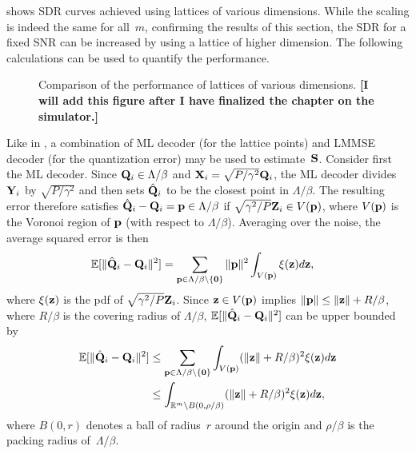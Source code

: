  shows SDR curves achieved using lattices of various
dimensions. While the scaling is indeed the same for all~$m$, confirming the
results of this section, the SDR for a fixed SNR can be increased by using a
lattice of higher dimension. The following calculations can be used to quantify
the performance.

\begin{figure}
  \begin{center}
  \end{center}
  \caption{Comparison of the performance of lattices of various dimensions.
  \textbf{[I will add this figure after I have finalized the chapter on the
  simulator.]}}
  \label{fig:sim_latticeperf}
\end{figure}

Like in , a combination of ML decoder (for the lattice
points) and LMMSE decoder (for the quantization error) may be used to
estimate~$\S$.  Consider first the ML decoder. Since $\Q_i \in \Lambda/\beta$
and $\X_i = \sqrt{P/\gamma^2} \Q_i$, the ML decoder divides $\Y_i$ by
$\sqrt{P/\gamma^2}$ and then sets $\Qhv_i$ to be the closest point in
$\Lambda/\beta$. The resulting error therefore satisfies $\Qhv_i - \Q_i = \p \in
\Lambda/\beta$ if $\sqrt{\gamma^2/P} \Zv_i \in V(\p)$, where $V(\p)$ is the
Voronoi region of $\p$ (with respect to $\Lambda/\beta$). Averaging over the
noise, the average squared error is then
\begin{align*}
  \mseqiv &= \sum_{\p \in \Lambda/\beta \setminus \{\vz\}} \| \p \|^2
  \int_{V(\p)} \xi(\z) d\z,
\end{align*}
where $\xi(\z)$ is the pdf of $\sqrt{\gamma^2/P} \Zv_i$.
Since $\z \in V(\p)$ implies $\|\p\| \le \|\z\| + R/\beta$, where $R/\beta$ is
the covering radius of $\Lambda/\beta$, $\mseqiv$ can be upper bounded by
\begin{align*}
  \mseqiv &\le \sum_{\p \in \Lambda/\beta \setminus \{\vz\}} \int_{V(\p)}
  (\|\z\| + R/\beta)^2 \xi(\z) d\z \\
  &\le \int_{\R^m \setminus B(0,\rho/\beta)} (\|\z\| + R/\beta)^2 \xi(\z) d\z,
\end{align*}
where $B(0,r)$ denotes a ball of radius~$r$ around the origin and $\rho/\beta$
is the packing radius of~$\Lambda/\beta$. 

